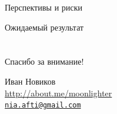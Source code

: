 \documentclass[usenames,dvipsnames,pdftex,unicode,hidelinks]{beamer}
\begin{document}
  \begin{frame}{Перспективы и риски}

  \end{frame}

  \begin{frame}{Ожидаемый результат}

  \end{frame}


  \section{}

  \begin{frame}[plain]
    \begin{center}
      { \Huge Спасибо за внимание! }

      \vspace{1cm}

      Иван Новиков\\
      \url{http://about.me/moonlighter}\\
      \href{mailto:nia.afti@gmail.com}{\nolinkurl{nia.afti@gmail.com} }
      
    \end{center}
  \end{frame}
\end{document}
